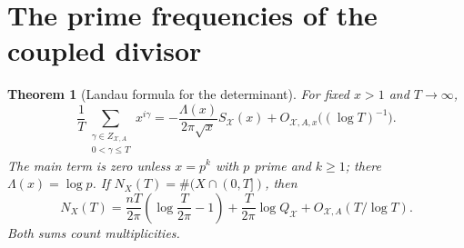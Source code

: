 \documentclass[11pt]{article}
\newtheorem{theorem}{Theorem}[section]
\newcommand{\cX}{\mathcal X}
\begin{document}
\section{The prime frequencies of the coupled divisor}

\begin{theorem}[Landau formula for the determinant]\label{land}
For fixed $x>1$ and $T\to\infty$,
\begin{equation}\label{lf}
 \frac1T\sum_{\substack{\gamma\in Z_{\cX,A}\\0<\gamma\le T}}x^{i\gamma}
 =-\frac{\Lambda(x)}{2\pi\sqrt x}S_{\cX}(x)
       +O_{\cX,A,x}\bigl((\log T)^{-1}\bigr).
\end{equation}
The main term is zero unless $x=p^k$ with $p$ prime and $k\ge1$; there $\Lambda(x)=\log p$.
If $N_X(T)=\#(X\cap(0,T])$, then
\begin{equation}\label{count}
 N_X(T)=\frac{nT}{2\pi}\left(\log\frac{T}{2\pi}-1\right)
     +\frac{T}{2\pi}\log Q_{\cX}+O_{\cX,A}(T/\log T).
\end{equation}
Both sums count multiplicities.
\end{theorem}
\end{document}
